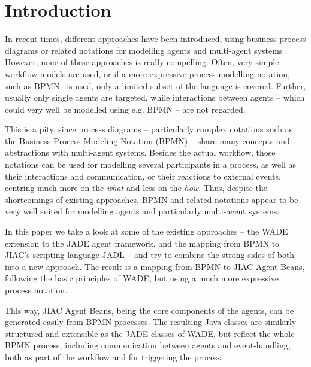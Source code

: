 

\section{Introduction}
\label{sec:intro}

In recent times, different approaches have been introduced, using business
process diagrams or related notations for modelling agents and multi-agent
systems~\cite{caire2008wade,kuester2010integrating}.  However, none of these
approaches is really compelling.  Often, very simple workflow models are used, or
if a more expressive process modelling notation, such as BPMN~\cite{omg2009bpmn}
is used, only a limited subset of the language is covered.  Further, usually only
single agents are targeted, while interactions between agents -- which could very
well be modelled using e.g. BPMN -- are not regarded.

This is a pity, since process diagrams -- particularly complex notations such as
the Business Process Modeling Notation (BPMN) -- share many concepts and abstractions
with multi-agent systems.  Besides the actual workflow, those notations can be
used for modelling several participants in a process, as well as their interactions
and communication, or their reactions to external events, centring much more on
the \emph{what} and less on the \emph{how}.  Thus, despite the shortcomings of
existing approaches, BPMN and related notations appear to be very well suited for
modelling agents and particularly multi-agent systems.

In this paper we take a look at some of the existing approaches -- the WADE
extension to the JADE agent framework, and the mapping from BPMN to JIAC's
scripting language JADL -- and try to combine the strong sides of both into a new
approach.  The result is a mapping from BPMN to JIAC Agent Beans, following the
basic principles of WADE, but using a much more expressive process notation.

This way, JIAC Agent Beans, being the core components of the agents, can be
generated easily from BPMN processes.  The resulting Java classes are similarly
structured and extensible as the JADE classes of WADE, but reflect the whole BPMN
process, including communication between agents and event-handling, both as part
of the workflow and for triggering the process.



